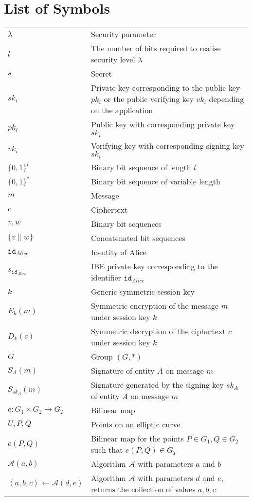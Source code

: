 \documentclass[master=eelt,masteroption=em]{kulemt}
\theoremstyle{plain}
\theoremstyle{definition}
\newcommand{\id}[1]{\ensuremath{\mathtt{id}_{#1}}}
\begin{document}
\chapter{List of Symbols}
\begin{flushleft}
 \renewcommand{\arraystretch}{1.1}
 \begin{tabularx}{\textwidth}{@{}p{30mm}X@{}}
  $\lambda$ & Security parameter \\
  $l$ & The number of bits required to realise security level $\lambda$ \\
  $s$ & Secret \\
  $sk_i$ & Private key corresponding to the public key $pk_i$ or the public verifying key $vk_i$ depending on the application \\
  $pk_i$ & Public key with corresponding private key $sk_i$ \\
  $vk_i$ & Verifying key with corresponding signing key $sk_i$ \\
  $\{ 0,1 \}^l$ & Binary bit sequence of length $l$ \\
  $\{ 0,1 \}^*$ & Binary bit sequence of variable length \\
  $m$ & Message \\
  $c$ & Ciphertext \\
  $v, w$ & Binary bit sequences \\
  $\{ v \parallel w \}$ & Concatenated bit sequences \\
  \id{Alice} & Identity of Alice \\ 
  $s_{\id{Alice}}$ & IBE private key corresponding to the identifier \id{Alice} \\
  $k$ & Generic symmetric session key \\
  $E_k \left( m \right)$ & Symmetric encryption of the message $m$ under session key $k$ \\
  $D_k \left( c \right)$ & Symmetric decryption of the ciphertext $c$ under session key $k$ \\
  $G$ & Group $\left( G, * \right)$ \\
  $S_A \left( m \right)$ & Signature of entity $A$ on message $m$ \\
  $S_{sk_A} \left( m \right)$ & Signature generated by the signing key $sk_A$ of entity $A$ on message $m$ \\
  $e: G_1 \times G_2 \rightarrow G_T$ & Bilinear map \\
  $U, P, Q$ & Points on an elliptic curve \\
  $e \left( P, Q \right)$ & Bilinear map  for the points $P \in G_1, Q \in G_2$ such that $e \left( P, Q \right) \in G_T$ \\  
  $\mathcal{A} \left( a, b \right)$ & Algorithm $\mathcal{A}$ with parameters $a$ and $b$ \\
  $\left< a, b, c \right> \leftarrow \mathcal{A}( d, e )$ & Algorithm $\mathcal{A}$ with parameters $d$ and $e$, returns the collection of values $a, b, c$ \\
  \end{tabularx}
\end{flushleft}
\end{document}
